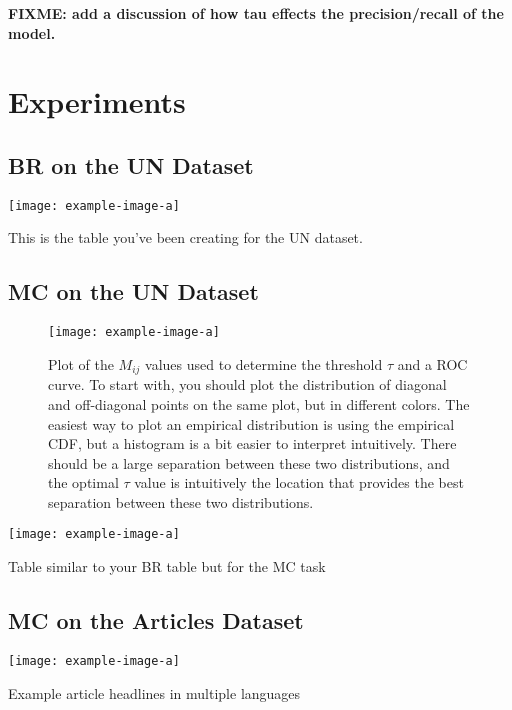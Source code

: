 \documentclass[11pt]{article}
\newcommand{\fixme}[1]{\textbf{FIXME: {#1}}}
\begin{document}
\fixme{add a discussion of how tau effects the precision/recall of the model.}

\section{Experiments}
\label{sec:experiments}

\subsection{BR on the UN Dataset}

\begin{table}
    \centering
    \texttt{[image: example-image-a]}
    \caption{This is the table you've been creating for the UN dataset.}
\end{table}

\subsection{MC on the UN Dataset}

\begin{figure}
    \centering
    \texttt{[image: example-image-a]}
    \caption{
        Plot of the $M_{ij}$ values used to determine the threshold $\tau$ and a ROC curve.
        To start with, you should plot the distribution of diagonal and off-diagonal points on the same plot, but in different colors.
        The easiest way to plot an empirical distribution is using the empirical CDF,
        but a histogram is a bit easier to interpret intuitively.
        There should be a large separation between these two distributions,
        and the optimal $\tau$ value is intuitively the location that provides the best separation between these two distributions.
    }
\end{figure}

\begin{table}
    \centering
    \texttt{[image: example-image-a]}
    \caption{Table similar to your BR table but for the MC task}
\end{table}

\subsection{MC on the Articles Dataset}


\begin{table}
    \centering
    \texttt{[image: example-image-a]}
    \caption{Example article headlines in multiple languages}
\end{table}
\end{document}
